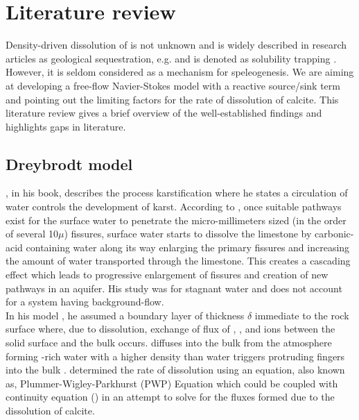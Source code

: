 \chapter{Literature review}\label{chapter:LiteratureReview}
\thispagestyle{empty}

Density-driven dissolution of  is not unknown and is widely described in research articles as 
geological sequestration, e.g.\cite{lindeberg1997reservoir, bachu2007co2} and is denoted as solubility 
trapping \cite{metz2005carbon}. However, it is seldom considered as a mechanism for speleogenesis. 
We are aiming at developing a free-flow Navier-Stokes model with a reactive source/sink term and pointing 
out the limiting factors for the rate of dissolution of calcite. This literature review gives a 
brief overview of the well-established findings and highlights gaps in literature.

\section{Dreybrodt model}\label{sec:dreybrodt}
\citet{Dreybrodt2012}, in his book, describes the process karstification where he states a circulation of water 
controls the development of karst. According to \citet{Dreybrodt2012}, once suitable pathways exist for the 
surface water to penetrate the micro-millimeters sized (in the order of several 10$\mu$) fissures, surface 
water starts to dissolve the limestone by carbonic-acid containing water along its way enlarging the primary fissures 
and increasing the amount of water transported through the limestone. This creates a cascading effect which leads 
to progressive enlargement of fissures and creation of new pathways in an aquifer. His study was for stagnant water 
and does not account for a system having background-flow.\\

In his model \cite{Dreybrodt2012}, he assumed a boundary layer of thickness $\delta$ immediate to the rock surface 
where, due to dissolution, exchange of flux of , , and  ions between the solid 
surface and the bulk occurs.  diffuses into the bulk from the atmosphere forming -rich water with a 
higher density than water triggers protruding fingers into the bulk \cite{Class2020}. \citet{Plummer1978} determined 
the rate of dissolution using an equation, also known as, Plummer-Wigley-Parkhurst (PWP) Equation which could be coupled 
with continuity equation () in an attempt to solve for the fluxes formed due to the dissolution of calcite.

